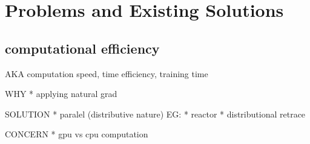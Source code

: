 \section{Problems and Existing Solutions}







\subsection{computational efficiency}
AKA
computation speed,
time efficiency,
training time

WHY
* applying natural grad

SOLUTION
* paralel (distributive nature)
  EG:
  * reactor
    * distributional retrace

CONCERN
* gpu vs cpu computation

